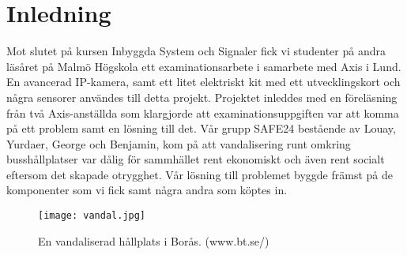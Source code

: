 



\chapter{Inledning}

\setcounter{page}{1}
\ifpdf
    \graphicspath{{1_introduction/figures/PNG/}{1_introduction/figures/PDF/}{1_introduction/figures/}}
\else
    \graphicspath{{1_introduction/figures/EPS/}{1_introduction/figures/}}
\fi

Mot slutet på kursen Inbyggda System och Signaler fick vi studenter på andra läsåret på Malmö Högskola ett examinationsarbete i samarbete med Axis i Lund. En avancerad IP-kamera, samt ett litet elektriskt kit med ett utvecklingskort och några sensorer användes till detta projekt. Projektet inleddes med en föreläsning från två Axis-anställda som klargjorde att examinationsuppgiften var att komma på ett problem samt en lösning till det. Vår grupp SAFE24 bestående av Louay, Yurdaer, George och Benjamin, kom på att vandalisering runt omkring busshållplatser var dålig för sammhället rent ekonomiskt och även rent socialt eftersom det skapade otrygghet. Vår lösning till problemet byggde främst på de komponenter som vi fick samt några andra som köptes in.
\begin{figure}[h]

  \texttt{[image: vandal.jpg]}
  \caption{En vandaliserad hållplats i Borås. (www.bt.se/)}
  \label{fig:vandal}
\end{figure}


